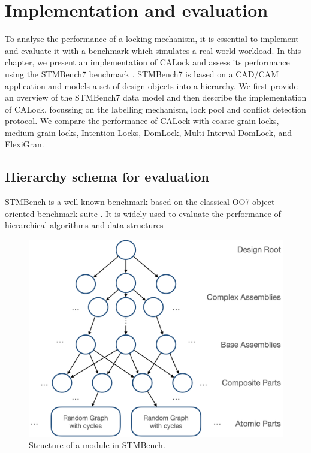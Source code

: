 \chapter{Implementation and evaluation}
\label{chap:implementation}

To analyse the performance of a locking mechanism, it is essential to implement and evaluate it with a benchmark which simulates a real-world workload. In this chapter, we present an implementation of CALock and assess its performance using the STMBench7 benchmark \cite{guerraoui2006stmbench7}. STMBench7 is based on a CAD/CAM application and models a set of design objects into a hierarchy. 
We first provide an overview of the STMBench7 data model and then describe the implementation of CALock, focussing on the labelling mechanism, lock pool and conflict detection protocol. We compare the performance of CALock with coarse-grain locks, medium-grain locks, Intention Locks, DomLock, Multi-Interval DomLock, and FlexiGran.

\section{Hierarchy schema for evaluation}

STMBench is a well-known benchmark based on the classical OO7 object-oriented benchmark suite \cite{CareyDN93}. It is widely used to evaluate the performance of hierarchical algorithms and data structures \cite{prokopec_renaissance_2019,vale_pot_2016, felber_hardware_2016, carvalho_optimizing_2016, kim_scheduling_2015,filipe_nested_2015,rito_props_2014,kalikar2016domlock,anjuMID, FlexiGran2024, KalikarN18, GaneshKN18, liu_unleashing_2014} 

\begin{figure}[h]
    \centering
    \captionsetup{justification=centering}
    \includegraphics[width=.7\columnwidth]{figures/STMBenchModuleWithoutLocks.png}
    \caption{Structure of a module in STMBench.}
    \label{stmbenchModuleUnlocked}
\end{figure}

